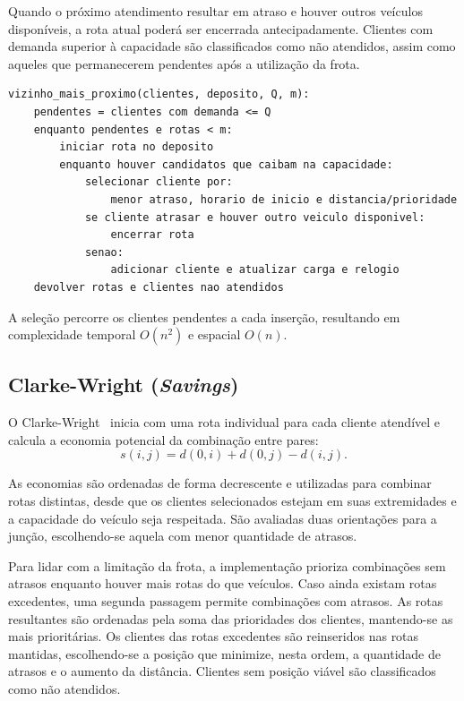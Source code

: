 \documentclass[12pt]{article}
\begin{document}
Quando o próximo atendimento resultar em atraso e houver outros veículos disponíveis,
a rota atual poderá ser encerrada antecipadamente. Clientes com demanda superior à
capacidade são classificados como não atendidos, assim como aqueles que permanecerem
pendentes após a utilização da frota.

\begin{lstlisting}
vizinho_mais_proximo(clientes, deposito, Q, m):
    pendentes = clientes com demanda <= Q
    enquanto pendentes e rotas < m:
        iniciar rota no deposito
        enquanto houver candidatos que caibam na capacidade:
            selecionar cliente por:
                menor atraso, horario de inicio e distancia/prioridade
            se cliente atrasar e houver outro veiculo disponivel:
                encerrar rota
            senao:
                adicionar cliente e atualizar carga e relogio
    devolver rotas e clientes nao atendidos
\end{lstlisting}

A seleção percorre os clientes pendentes a cada inserção, resultando em complexidade
temporal $O(n^2)$ e espacial $O(n)$.

\subsection{Clarke-Wright (\textit{Savings})}

O Clarke-Wright~\cite{clarke1964scheduling} inicia com uma rota individual para cada
cliente atendível e calcula a economia potencial da combinação entre pares:
\[ s(i, j) = d(0, i) + d(0, j) - d(i, j). \]

As economias são ordenadas de forma decrescente e utilizadas para combinar rotas
distintas, desde que os clientes selecionados estejam em suas extremidades e a
capacidade do veículo seja respeitada. São avaliadas duas orientações para a junção,
escolhendo-se aquela com menor quantidade de atrasos.

Para lidar com a limitação da frota, a implementação prioriza combinações sem atrasos
enquanto houver mais rotas do que veículos. Caso ainda existam rotas excedentes, uma
segunda passagem permite combinações com atrasos. As rotas resultantes são ordenadas
pela soma das prioridades dos clientes, mantendo-se as mais prioritárias. Os clientes
das rotas excedentes são reinseridos nas rotas mantidas, escolhendo-se a posição que
minimize, nesta ordem, a quantidade de atrasos e o aumento da distância. Clientes sem
posição viável são classificados como não atendidos.
\end{document}
